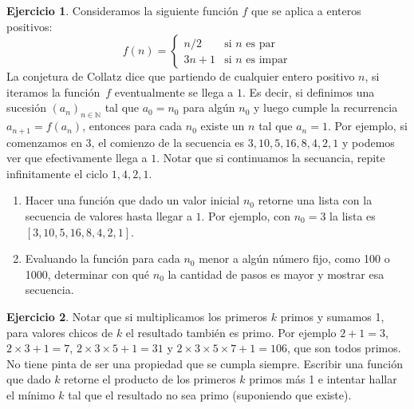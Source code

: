 \documentclass[a4paper,12pt]{book}
\newcommand{\N}{\mathbb{N}}
\newcommand{\te}{\text}
\theoremstyle{definition}
\newtheorem{ejercicio}{Ejercicio}
\begin{document}
	\begin{ejercicio}
		Consideramos la siguiente función $f$ que se aplica a enteros positivos:
		$$f(n) = \begin{cases}
			n/2 &\te{si $n$ es par}\\
			3n+1 &\te{si $n$ es impar}
		\end{cases}
		$$
		La conjetura de Collatz dice que partiendo de cualquier entero positivo $n$, si iteramos la función~$f$ eventualmente se llega a $1$. Es decir, si definimos una sucesión $(a_n)_{n\in\N}$ tal que $a_0=n_0$ para algún $n_0$ y luego cumple la recurrencia $a_{n+1}=f(a_n)$, entonces para cada $n_0$ existe un $n$ tal que $a_n=1$. Por ejemplo, si comenzamos en $3$, el comienzo de la secuencia es $3,10,5,16,8,4,2,1$ y podemos ver que efectivamente llega a $1$. Notar que si continuamos la secuancia, repite infinitamente el ciclo $1,4,2,1$.
		\begin{enumerate}
			\item Hacer una función que dado un valor inicial $n_0$ retorne una lista con la secuencia de valores hasta llegar a $1$. Por ejemplo, con $n_0=3$ la lista es $[3,10,5,16,8,4,2,1]$.
			\item Evaluando la función para cada $n_0$ menor a algún número fijo, como 100 o 1000, determinar con qué $n_0$ la cantidad de pasos es mayor y mostrar esa secuencia.
		\end{enumerate}
	\end{ejercicio}
	
	\begin{ejercicio}
		Notar que si multiplicamos los primeros $k$ primos y sumamos 1, para valores chicos de $k$ el resultado también es primo. Por ejemplo $2+1=3$, $2\times 3 + 1 = 7$, $2\times 3 \times 5 + 1 = 31$ y $2\times 3 \times 5 \times 7 + 1 = 106$, que son todos primos. No tiene pinta de ser una propiedad que se cumpla siempre. Escribir una función que dado $k$ retorne el producto de los primeros $k$ primos más 1 e intentar hallar el mínimo $k$ tal que el resultado no sea primo (suponiendo que existe). 
	\end{ejercicio}
	
\end{document}

